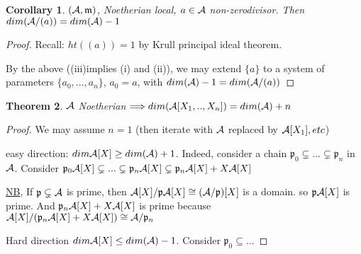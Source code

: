 \documentclass[11pt]{article}
\newtheorem{thm}{Theorem}[section]
\newtheorem{cor}[thm]{Corollary}
\newcommand{\scm}{{\mathfrak m}}
\newcommand{\scp}{{\mathfrak p}}
\newcommand{\cala}{{\cal A}}
\newcommand{\Lrta}{\Longrightarrow}
\begin{document}
\begin{cor}
$(\cala,\scm)$, Noetherian local, $a\in\cala$ non-zerodivisor. Then $dim(\cala/(a))=dim(\cala)-1$
\end{cor}
\begin{proof}
Recall: $ht((a))=1$ by Krull principal ideal theorem.

By the above ((iii)implies (i) and (ii)), we may extend $\{a\}$ to a system of parameters $\{a_0,...,a_n\}$, $a_0=a$, with $dim(\cala)-1=dim(\cala/(a))$
\end{proof}

\begin{thm}
$\cala$ Noetherian $\Lrta dim(\cala[X_1,..,X_n])=dim(\cala)+n$
\end{thm}
\begin{proof}
We may assume $n=1$ (then iterate with $\cala$ replaced by $\cala[X_1], etc$)

easy direction: $dim \cala[X]\geq dim(\cala)+1$. Indeed, consider a chain $\scp_0\subsetneq ...\subsetneq \scp_n$ in $\cala$. Consider $\scp_0\cala[X]\subsetneq ...\subsetneq \scp_n\cala[X]\subsetneq \scp_n\cala[X]+X\cala[X]$

\underline{NB}, If $\scp\subsetneq \cala$ is prime, then $\cala[X]/\scp\cala[X]\cong (\cala/\scp)[X]$ is  a domain. so $\scp\cala[X]$ is prime.
And $\scp_n\cala[X]+X\cala[X]$ is prime because $\cala[X]/(\scp_n\cala[X]+X\cala[X])\cong \cala/\scp_n$

Hard direction $dim\cala[X]\leq dim(\cala)-1$. Consider $\scp_0\subseteq...$
\end{proof}
\end{document}
